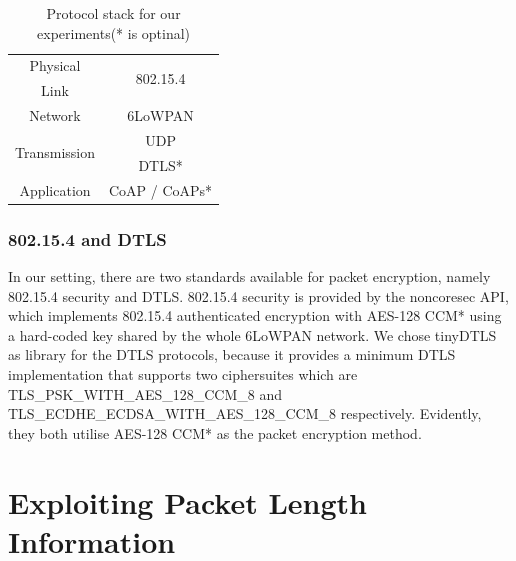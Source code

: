 \documentclass{article}
\begin{document}
\begin{table}[!h]
	\centering
	\begin{tabular}{|c|c|}
	\hline
	Physical                        & \multirow{2}{*}{802.15.4} \\ \cline{1-1}
	Link                          &                           \\ \hline
	Network                       & 6LoWPAN                   \\ \hline
	\multirow{2}{*}{Transmission} & UDP                       \\ \cline{2-2} 
	                              & DTLS*                     \\ \hline
	Application                   & CoAP / CoAPs*             \\ \hline
	\end{tabular}

	\caption{Protocol stack for our experiments(* is optinal)\label{Protocols}}
\end{table}


\subsubsection{802.15.4 and DTLS}
In our setting, there are two standards available for packet encryption, namely 802.15.4 security\cite{802154} and DTLS\cite{rfc6347}. 802.15.4 security is provided by the noncoresec\cite{noncoresec} API, which implements 802.15.4 authenticated encryption with AES-128 CCM*\cite{CCM} using a hard-coded key shared by the whole 6LoWPAN network. We chose tinyDTLS\cite{tinydtls}  as library for the DTLS protocols, because it provides a minimum DTLS implementation that supports two ciphersuites which are TLS\_PSK\_WITH\_AES\_128\_CCM\_8\cite{rfc6655} and TLS\_ECDHE\_ECDSA\_WITH\_AES\_128\_CCM\_8\cite{rfc6655} respectively. Evidently, they both utilise AES-128 CCM* as the packet encryption method.

\section{Exploiting Packet Length Information\label{sec: PacketLen}}
\end{document}
